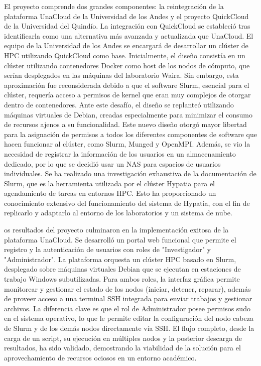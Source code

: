 El proyecto comprende dos grandes componentes: la reintegración de la plataforma UnaCloud de la Universidad de los Andes y el proyecto QuickCloud de la Universidad del Quindío. La integración con QuickCloud se estableció tras identificarla como una alternativa más avanzada y actualizada que UnaCloud. El equipo de la Universidad de los Andes se encargará de desarrollar un clúster de HPC utilizando QuickCloud como base. Inicialmente, el diseño consistía en un clúster utilizando contenedores Docker como host de los nodos de cómputo, que serían desplegados en las máquinas del laboratorio Waira. Sin embargo, esta aproximación fue reconsiderada debido a que el software Slurm, esencial para el clúster, requería acceso a permisos de kernel que eran muy complejos de otorgar dentro de contenedores. Ante este desafío, el diseño se replanteó utilizando máquinas virtuales de Debian, creadas especialmente para minimizar el consumo de recursos ajenos a su funcionalidad. Este nuevo diseño otorgó mayor libertad para la asignación de permisos a todos los diferentes componentes de software que hacen funcionar al clúster, como Slurm, Munged y OpenMPI. Además, se vio la necesidad de registrar la información de los usuarios en un almacenamiento dedicado, por lo que se decidió usar un NAS para espacios de usuarios individuales. Se ha realizado una investigación exhaustiva de la documentación de Slurm, que es la herramienta utilizada por el clúster Hypatia para el agendamiento de tareas en entornos HPC. Esto ha proporcionado un conocimiento extensivo del funcionamiento del sistema de Hypatia, con el fin de replicarlo y adaptarlo al entorno de los laboratorios y un sistema de nube.

os resultados del proyecto culminaron en la implementación exitosa de la plataforma UnaCloud. Se desarrolló un portal web funcional que permite el registro y la autenticación de usuarios con roles de "Investigador" y "Administrador". La plataforma orquesta un clúster HPC basado en Slurm, desplegado sobre máquinas virtuales Debian que se ejecutan en estaciones de trabajo Windows subutilizadas. Para ambos roles, la interfaz gráfica permite monitorear y gestionar el estado de los nodos (iniciar, detener, reparar), además de proveer acceso a una terminal SSH integrada para enviar trabajos y gestionar archivos. La diferencia clave es que el rol de Administrador posee permisos sudo en el sistema operativo, lo que le permite editar la configuración del nodo cabeza de Slurm y de los demás nodos directamente vía SSH. El flujo completo, desde la carga de un script, su ejecución en múltiples nodos y la posterior descarga de resultados, ha sido validado, demostrando la viabilidad de la solución para el aprovechamiento de recursos ociosos en un entorno académico.

